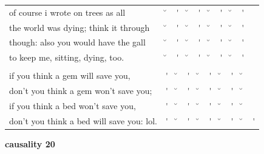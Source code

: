 \documentclass[12pt, landscape]{article}
\begin{document}
\begin{center}
\begin{tabularx}{\textwidth}{
>{\lefting\arraybackslash}X
c
c
c
c
c
c
c
c
c
}

of course i wrote on trees as all & \u{} & \'{} & \u{} & \'{} & \u{} & \'{} & \u{} & \'{} & \\
the world was dying; think it through & \u{} & \'{} & \u{} & \'{} & \u{} & \'{} & \u{} & \'{} & \\
though: also you would have the gall & \u{} & \'{} & \u{} & \'{} & \u{} & \'{} & \u{} & \'{} & \\
to keep me, sitting, dying, too. & \u{} & \'{} & \u{} & \'{} & \u{} & \'{} & \u{} & \'{} & \\
 & & & & & & & & \\
if you think a gem will save you, & \'{} & \u{} & \'{} & \u{} & \'{} & \u{} & \'{} & \u{} & \\
don't you think a gem won't save you; & \'{} & \u{} & \'{} & \u{} & \'{} & \u{} & \'{} & \u{} & \\
if you think a bed won't save you, & \'{} & \u{} & \'{} & \u{} & \'{} & \u{} & \'{} & \u{} & \\
don't you think a bed will save you: lol. & \'{} & \u{} & \'{} & \u{} & \'{} & \u{} & \'{} & \u{} & \'{} \\

\end{tabularx}
\end{center}

\vspace*{\fill}

\newpage

\vspace*{\fill}

\noindent \textbf{causality 20}
\noindent \hfill \par
\end{document}
